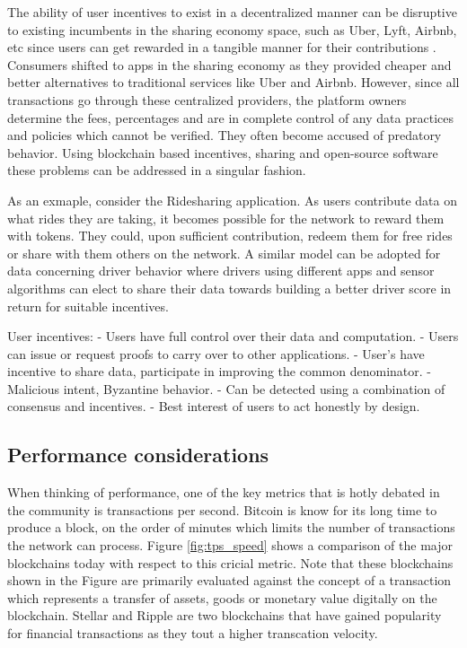 The ability of user incentives to exist in a decentralized manner can be disruptive to existing incumbents in the
sharing economy space, such as Uber, Lyft, Airbnb, etc since users can get rewarded in a tangible manner for their
contributions \cite{sharing_eco_bc}. Consumers shifted to apps in the sharing economy as they provided cheaper and
better alternatives to traditional services like Uber and Airbnb. However, since all transactions go through these
centralized providers, the platform owners determine the fees, percentages and are in complete control of any data
practices and policies which cannot be verified. They often become accused of predatory behavior. Using blockchain based
incentives, sharing and open-source software these problems can be addressed in a singular fashion.

As an exmaple, consider the Ridesharing application. As users contribute data on what rides they are taking, it becomes
possible for the network to reward them with tokens. They could, upon sufficient contribution, redeem them for free
rides or share with them others on the network. A similar model can be adopted for data concerning driver behavior where
drivers using different apps and sensor algorithms can elect to share their data towards building a better driver score
in return for suitable incentives.

User incentives:
 - Users have full control over their data and computation.
 - Users can issue or request proofs to carry over to other applications.
 - User’s have incentive to share data, participate in improving the common denominator.
 - Malicious intent, Byzantine behavior.
   - Can be detected using a combination of consensus and incentives.
   - Best interest of users to act honestly by design.

\noindent
\subsection{Performance considerations}

When thinking of performance, one of the key metrics that is hotly debated in the community is transactions per second.
Bitcoin is know for its long time to produce a block, on the order of minutes which limits the number of transactions
the network can process. Figure \ref{fig:tps_speed} shows a comparison of the major blockchains today with respect to
this cricial metric. Note that these blockchains shown in the Figure are primarily evaluated against the concept of a
transaction which represents a transfer of assets, goods or monetary value digitally on the blockchain. Stellar and
Ripple are two blockchains that have gained popularity for financial transactions as they tout a higher transcation
velocity. 

